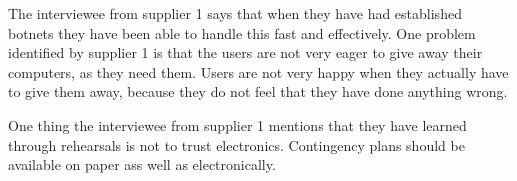 The interviewee from supplier 1 says that when they have had established botnets they have been able to handle this fast and effectively. One problem identified by supplier 1 is that the users are not very eager to give away their computers, as they need them. Users are not very happy when they actually have to give them away, because they do not feel that they have done anything wrong.

One thing the interviewee from supplier 1 mentions that they have learned through rehearsals is not to trust electronics. Contingency plans should be available on paper ass well as electronically.